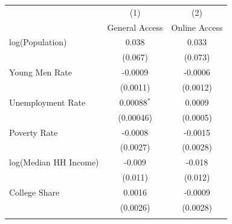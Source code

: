 \begin{tabular}{@{\extracolsep{5pt}} lcc} 
\toprule
\midrule
 & (1) & (2) \\
   & General Access  & Online Access  \\ 
\midrule

\enspace log(Population) & 0.038 & 0.033  \\ 
 & (0.067) & (0.073) \\ 
 \addlinespace
\enspace  Young Men Rate & -0.0009 & -0.0006 \\ 
  & (0.0011) & (0.0012) \\ 
 \addlinespace  
 \enspace  Unemployment Rate & 0.00088$^{*}$ & 0.0009 \\ 
 & (0.00046) & (0.0005) \\ 
 \addlinespace
\enspace Poverty Rate & -0.0008 & -0.0015 \\ 
 & (0.0027) & (0.0028) \\ 
 \addlinespace
 \enspace log(Median HH Income) & -0.009 & -0.018 \\ 
  & (0.011) & (0.012) \\ 
 \addlinespace
 \enspace College Share & 0.0016 & -0.0009 \\ 
  & (0.0026) & (0.0028) \\ 
 \addlinespace
 
\bottomrule 
\end{tabular} 
